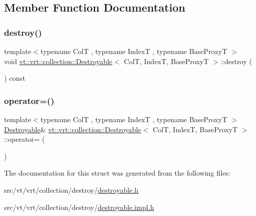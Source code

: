 \subsection{Member Function Documentation}
\mbox{\label{structvt_1_1vrt_1_1collection_1_1_destroyable_a4c73173068a636f91b737ca28222c7cb}} 
\subsubsection{\texorpdfstring{destroy()}{destroy()}}
{\footnotesize\ttfamily template$<$typename ColT , typename IndexT , typename Base\+ProxyT $>$ \\
void \hyperlink{structvt_1_1vrt_1_1collection_1_1_destroyable}{vt\+::vrt\+::collection\+::\+Destroyable}$<$ ColT, IndexT, Base\+ProxyT $>$\+::destroy (\begin{DoxyParamCaption}{ }\end{DoxyParamCaption}) const}

\mbox{\label{structvt_1_1vrt_1_1collection_1_1_destroyable_a12674a0a72773cbfc36299f8e1dbcbf7}} 
\subsubsection{\texorpdfstring{operator=()}{operator=()}}
{\footnotesize\ttfamily template$<$typename ColT , typename IndexT , typename Base\+ProxyT $>$ \\
\hyperlink{structvt_1_1vrt_1_1collection_1_1_destroyable}{Destroyable}\& \hyperlink{structvt_1_1vrt_1_1collection_1_1_destroyable}{vt\+::vrt\+::collection\+::\+Destroyable}$<$ ColT, IndexT, Base\+ProxyT $>$\+::operator= (\begin{DoxyParamCaption}\item[{\hyperlink{structvt_1_1vrt_1_1collection_1_1_destroyable}{Destroyable}$<$ ColT, IndexT, Base\+ProxyT $>$ const \&}]{ }\end{DoxyParamCaption})\hspace{0.3cm}{\ttfamily [default]}}



The documentation for this struct was generated from the following files\+:\begin{DoxyCompactItemize}
\item 
src/vt/vrt/collection/destroy/\hyperlink{destroyable_8h}{destroyable.\+h}\item 
src/vt/vrt/collection/destroy/\hyperlink{destroyable_8impl_8h}{destroyable.\+impl.\+h}\end{DoxyCompactItemize}
